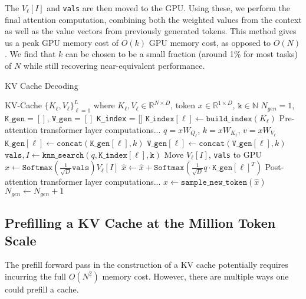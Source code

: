 The $V_{\ell}[I]$ and \texttt{vals} are then moved to the GPU. Using these, we perform the final attention computation, combining both the weighted values from the context as well as the value vectors from previously generated tokens. This method gives us a peak GPU memory cost of $O(k)$ GPU memory cost, as opposed to $O(N)$. We find that $k$ can be chosen to be a small fraction (around 1\% for most tasks) of $N$ while still recovering near-equivalent performance.

\begin{algorithm}
    \caption{\Topk KV Cache Decoding}\label{alg:gen_topk}
    \begin{algorithmic}[1]
        \REQUIRE KV-Cache $\{K_{\ell}, V_{\ell}\}_{\ell=1}^{L}$ where $K_{\ell}, V_{\ell} \in \mathbb{R}^{N \times D}$, token $x\in \mathbb{R}^{1\times D}$, $\texttt{k} \in \mathbb{N}$
        \STATE $N_{gen} = 1$, $\texttt{K\_gen} = []$, $\texttt{V\_gen} = []$
        \STATE \texttt{K\_index} = []
            \STATE $\texttt{K\_index}[\ell] \gets \texttt{build\_index}(K_{\ell})$
        \ENDFOR 
                \STATE Pre-attention transformer layer computations...
                \STATE $q = xW_{Q_{\ell}}$, $k = xW_{K_{\ell}}$, $v = xW_{V_{\ell}}$
                \STATE $\texttt{K\_gen}[\ell] \gets \texttt{concat}(\texttt{K\_gen}[\ell], k)$  
                \STATE $\texttt{V\_gen}[\ell] \gets \texttt{concat}(\texttt{V\_gen}[\ell], k)$ 
                \STATE $\texttt{vals}, I \gets \texttt{knn\_search}(q, \texttt{K\_index}[\ell], \texttt{k})$ 
                \STATE Move $V_{\ell}[I]$, \texttt{vals} to GPU
                \STATE $\hat{x}\gets \texttt{Softmax}(\frac{1}{\sqrt{D}}\texttt{vals})V_{\ell}[I] $ 
                \STATE $\hat{x}\gets \hat{x} + \texttt{Softmax}\left(\frac{1}{\sqrt{D}}q\cdot\texttt{K\_gen}[\ell]^T\right)$
                \STATE Post-attention transformer layer computations...
            \ENDFOR
            \STATE $x \gets \texttt{sample\_new\_token}(\hat{x})$
            \STATE $N_{gen} \gets N_{gen} + 1$
        \ENDWHILE
    \end{algorithmic}
\end{algorithm}
\subsection{Prefilling a KV Cache at the Million Token Scale}
The prefill forward pass in the construction of a KV cache potentially requires incurring the full $O(N^{2})$ memory cost. However, there are multiple ways one could prefill a cache. 

